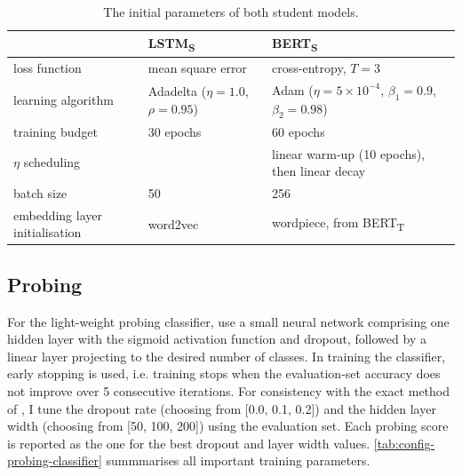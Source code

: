 \documentclass[bsc,frontabs,twoside,singlespacing,parskip,deptreport]{infthesis}
\def\BERTT{BERT\textsubscript{T}}
\def\BERTS{BERT\textsubscript{S}}
\def\LSTMS{LSTM\textsubscript{S}}
\begin{document}
{{{      \begin{table}[h!tb]
      \centering
      \begin{tabular}{m{}|m{}|m{}}
      & \LSTMS & \BERTS \\
      \hline
      loss function & mean square error & cross-entropy, $T=3$ \\
      \hline
      learning algorithm & Adadelta ($\eta=1.0$, $\rho=0.95$) &  Adam ($\eta=5\times10^{-4}$, $\beta_1=0.9$, $\beta_2=0.98$) \\
      \hline
      training budget & 30 epochs & 60 epochs \\
      \hline
      $\eta$ scheduling &  & linear warm-up (10 epochs), then linear decay \\
      \hline
      batch size & 50 & 256 \\
      \hline
      embedding layer initialisation & word2vec & wordpiece, from \BERTT \\
      \hline
      \end{tabular}
      \caption{The initial parameters of both student models.}
      \label{tab:initial-configs}
      \end{table}
    }

    \subsection{Probing}{
      \label{sec:implementation-details-probing}
      For the light-weight probing classifier, \citet{Conneau_2018} use a small neural network comprising one hidden layer with the sigmoid activation function and dropout, followed by a linear layer projecting to the desired number of classes. 
      In training the classifier, early stopping is used, i.e. training stops when the evaluation-set accuracy does not improve over 5 consecutive iterations.
      For consistency with the exact method of \citeauthor{Conneau_2018}, I tune the dropout rate (choosing from [0.0, 0.1, 0.2]) and the hidden layer width (choosing from [50, 100, 200]) using the evaluation set. Each probing score is reported as the one for the best dropout and layer width values.
      \autoref{tab:config-probing-classifier} summmarises all important training parameters.

}}}
\end{document}
